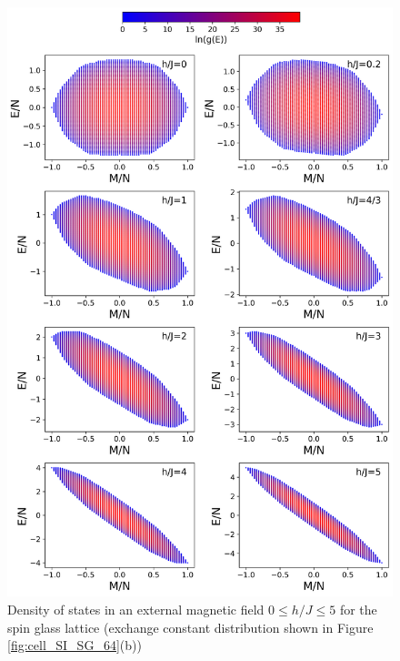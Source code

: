 \documentclass[utf8, babel, sor, jor, amsmath, amssymb, reprint]{elsarticle} %
\begin{document}
\begin{figure}[H]
		\centering
		\includegraphics[width=1\linewidth]{pictures/HDOS_SG_64_J0.png}
	\caption{Density of states in an external magnetic field $0\leq h/J \leq 5$ for the spin glass lattice (exchange constant distribution shown in Figure \ref{fig:cell_SI_SG_64}(b))}
	\label{fig:HDOS_glass}
\end{figure}
\end{document}
